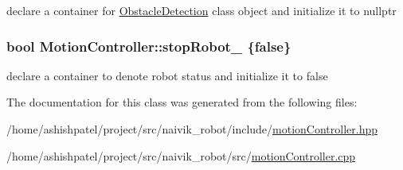 declare a container for \hyperlink{classObstacleDetection}{Obstacle\+Detection} class object and initialize it to nullptr 

\subsubsection[{\texorpdfstring{stop\+Robot\+\_\+}{stopRobot_}}]{\setlength{\rightskip}{0pt plus 5cm}bool Motion\+Controller\+::stop\+Robot\+\_\+ \{false\}\hspace{0.3cm}{\ttfamily [private]}}\hypertarget{classMotionController_a586e795cc2377ddc399f32f18da871e0}{}\label{classMotionController_a586e795cc2377ddc399f32f18da871e0}


declare a container to denote robot status and initialize it to false 



The documentation for this class was generated from the following files\+:\begin{DoxyCompactItemize}
\item 
/home/ashishpatel/project/src/naivik\+\_\+robot/include/\hyperlink{motionController_8hpp}{motion\+Controller.\+hpp}\item 
/home/ashishpatel/project/src/naivik\+\_\+robot/src/\hyperlink{motionController_8cpp}{motion\+Controller.\+cpp}\end{DoxyCompactItemize}
